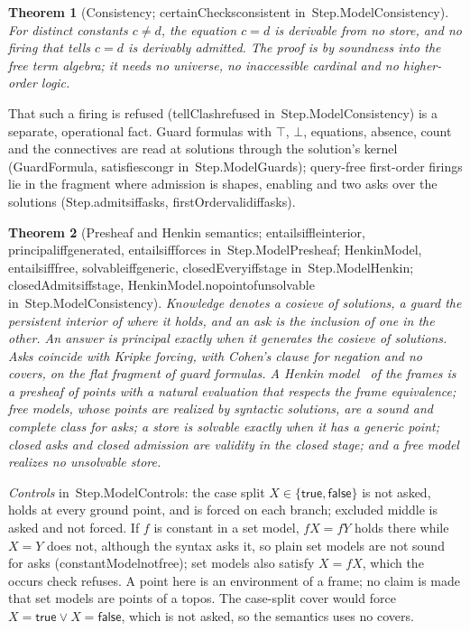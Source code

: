 \documentclass[11pt]{article}
\newtheorem{theorem}{Theorem}
\theoremstyle{remark}
\newcommand{\lean}[1]{{\ttfamily\def\_{\textunderscore\allowbreak}#1}}
\newcommand{\inmod}[1]{in~{\ttfamily\def\_{\textunderscore\allowbreak}#1}}
\begin{document}
\begin{theorem}[Consistency; \lean{certainChecks\_consistent} \inmod{Step.ModelConsistency}]
For distinct constants $c\ne d$, the equation $c = d$ is derivable from no store, and no firing that tells
$c = d$ is derivably admitted. The proof is by soundness into the free term algebra; it needs no
universe, no inaccessible cardinal and no higher-order logic.
\end{theorem}
That such a firing is refused (\lean{tellClash\_refused} \inmod{Step.ModelConsistency}) is a separate, operational fact. Guard formulas
with $\top$, $\bot$, equations, absence, count and the connectives are read at solutions through the
solution's kernel (\lean{GuardFormula}, \lean{satisfies\_congr} \inmod{Step.ModelGuards}); query-free
first-order firings lie in the fragment where admission is shapes, enabling and two asks over the solutions
(\lean{Step.admits\_iff\_asks}, \lean{firstOrder\_valid\_iff\_asks}).

\begin{theorem}[Presheaf and Henkin semantics; \lean{entails\_iff\_le\_interior}, \lean{principal\_iff\_generated}, \lean{entails\_iff\_forces} \inmod{Step.ModelPresheaf}; \lean{HenkinModel}, \lean{entails\_iff\_free}, \lean{solvable\_iff\_generic}, \lean{closedEvery\_iff\_stage} \inmod{Step.ModelHenkin}; \lean{closedAdmits\_iff\_stage}, \lean{HenkinModel.no\_point\_of\_unsolvable} \inmod{Step.ModelConsistency}]
Knowledge denotes a cosieve of solutions, a guard the persistent interior of where it holds, and an ask
is the inclusion of one in the other. An answer is principal exactly when it generates the cosieve of
solutions. Asks coincide with Kripke forcing, with Cohen's clause for negation and no covers, on the
flat fragment of guard formulas. A Henkin model~\cite{henkin50} of the frames is a presheaf of points
with a natural evaluation that respects the frame equivalence; free models, whose points are realized
by syntactic solutions, are a sound and complete class for asks; a store is solvable exactly when it has
a generic point; closed asks and closed admission are validity in the closed stage; and a free model
realizes no unsolvable store.
\end{theorem}

\emph{Controls} \inmod{Step.ModelControls}: the case split $X\in\{\mathsf{true},\mathsf{false}\}$ is not asked,
holds at every ground point, and is forced on each branch; excluded middle is asked and not forced. If
$f$ is constant in a set model, $f X = f Y$ holds there while $X = Y$ does not, although the syntax asks
it, so plain set models are not sound for asks (\lean{constantModel\_not\_free}); set models also satisfy
$X = f X$, which the occurs check refuses. A point here is an environment of a frame; no claim is made
that set models are points of a topos. The case-split cover would force $X=\mathsf{true}\vee X=\mathsf{false}$, which is not asked, so the semantics uses no covers.
\end{document}
